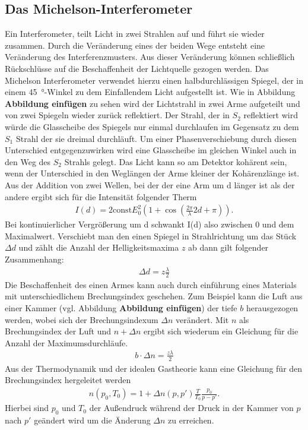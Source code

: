 \subsection{Das Michelson-Interferometer}
Ein Interferometer, teilt Licht in zwei Strahlen auf und führt sie wieder zusammen.
Durch die Veränderung eines der beiden Wege entsteht eine Veränderung des Interferenzmusters.
Aus dieser Veränderung können schließlich Rückschlüsse auf die Beschaffenheit der Lichtquelle gezogen werden.
Das Michelson Interferometer verwendet hierzu einen halbdurchlässigen Spiegel, der in einem \qty{45}{\degree}-Winkel 
zu dem Einfallendem Licht aufgestellt ist. 
Wie in Abbildung \textbf{Abbildung einfügen} zu sehen wird der Lichtstrahl in zwei Arme aufgeteilt und von zwei Spiegeln wieder zurück reflektiert.
Der Strahl, der in $S_2$ reflektiert wird würde die Glasscheibe des Spiegels nur einmal durchlaufen im Gegensatz zu dem $S_1$ Strahl
der sie dreimal durchläuft.
Um einer Phasenverschiebung durch diesen Unterschied entgegenzuwirken wird eine Glasscheibe im gleichen Winkel 
auch in den Weg des $S_2$ Strahls gelegt.
Das Licht kann so am Detektor kohärent sein, wenn der Unterschied in den Weglängen der Arme kleiner der Kohärenzlänge ist.
Aus der Addition von zwei Wellen, bei der der eine Arm um d länger ist als der andere ergibt sich für die Intensität folgender Therm
\begin{align}
    I(d) = 2 \text{const} E_0^2 \left(1+ \cos\left(\frac{2\pi}{\lambda} 2d + \pi\right)\right).
\end{align}
Bei kontinuierlicher Vergrößerung um d schwankt I(d) also zwischen 0 und dem Maximalwert.
Verschiebt man den einen Spiegel in Strahlrichtung um das Stück $\Delta d$ und zählt die Anzahl der Helligkeitsmaxima $z$ ab
dann gilt folgender Zusammenhang:
\begin{align}
    \Delta d = z \frac{\lambda}{2}
    \label{eq:d_mod}
\end{align} 
Die Beschaffenheit des einen Armes kann auch durch einführung eines Materials mit unterschiedlichem Brechungsindex 
geschehen.
Zum Beispiel kann die Luft aus einer Kammer (vgl. Abbildung \textbf{Abbildung einfügen}) der tiefe $b$ herausgezogen werden,
wobei sich der Brechungsindexum $\Delta n$ verändert.
Mit $n$ als Brechungsindex der Luft und $n + \Delta n$ ergibt sich wiederum ein Gleichung für die Anzahl der Maximumsdurchläufe.
\begin{align}
    b \cdot \Delta n = \frac{z \lambda}{2}
    \label{eq:n_mod}
\end{align}
Aus der Thermodynamik und der idealen Gastheorie kann eine Gleichung für den Brechungsindex hergeleitet werden
\begin{align}
    n(p_0, T_0) = 1 + \Delta n(p, p') \frac{T}{T_0} \frac{p_0}{p-p'}.
    \label{eq:p_primed}
\end{align}
Hierbei sind $p_0$ und $T_0$ der Außendruck während der Druck in der Kammer von $p$ nach $p'$ geändert wird 
um die Änderung $\Delta n$ zu erreichen.

